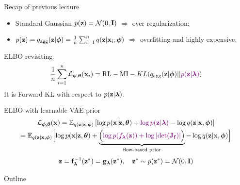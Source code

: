 \begin{frame}{Recap of previous lecture}
	\begin{itemize}
		\item Standard Gaussian $p(\mathbf{z}) = \mathcal{N}(0, \mathbf{I})$ $\Rightarrow$ over-regularization;
		\item $p(\mathbf{z}) = q_{\text{agg}}(\mathbf{z} | \boldsymbol{\phi}) = \frac{1}{n}\sum_{i=1}^n q(\mathbf{z} | \mathbf{x}_i, \boldsymbol{\phi})$ $\Rightarrow$ overfitting and highly expensive.
	\end{itemize}
	\begin{block}{ELBO revisiting}
		\vspace{-0.4cm}
		\[
		\frac{1}{n}\sum_{i=1}^n \mathcal{L}_{\boldsymbol{\phi}, \boldsymbol{\theta}}(\mathbf{x}_i) = \text{RL} - \text{MI} -  KL(q_{\text{agg}}(\mathbf{z} | \boldsymbol{\phi}) || {\color{violet}p(\mathbf{z} | \boldsymbol{\lambda})})
		\]
		It is Forward KL with respect to $p(\mathbf{z} | \boldsymbol{\lambda})$.
	\end{block}
	\begin{block}{ELBO with learnable VAE prior}
		\vspace{-0.6cm}
		{\small
			\begin{multline*}
				\mathcal{L}_{\boldsymbol{\phi}, \boldsymbol{\theta}}(\mathbf{x}) = \mathbb{E}_{q(\mathbf{z} | \mathbf{x}, \boldsymbol{\phi})} \left[ \log p(\mathbf{x} | \mathbf{z}, \boldsymbol{\theta}) + {\color{violet}\log p(\mathbf{z} | \boldsymbol{\lambda})} - \log q(\mathbf{z} | \mathbf{x}, \boldsymbol{\phi}) \right] \\
				= \mathbb{E}_{q(\mathbf{z} | \mathbf{x}, \boldsymbol{\phi})} \Bigl[ \log p(\mathbf{x} | \mathbf{z}, \boldsymbol{\theta}) + \underbrace{ \Bigl({\color{violet} \log p(f_{\boldsymbol{\lambda}}(\mathbf{z})) + \log \left| \det (\mathbf{J}_{\mathbf{f}}) \right|} \Bigr) }_{\text{flow-based prior}} - \log q(\mathbf{z} | \mathbf{x}, \boldsymbol{\phi}) \Bigr] 
			\end{multline*}
		}
		\vspace{-0.5cm}
		\[
		\mathbf{z} = \mathbf{f}^{-1}_{\boldsymbol{\lambda}}(\mathbf{z}^*) = \mathbf{g}_{\boldsymbol{\lambda}}(\mathbf{z}^*), \quad \mathbf{z}^* \sim p(\mathbf{z}^*) = \mathcal{N}(0, \mathbf{I})
		\]
	\end{block}
	\vspace{-0.5cm}
\end{frame}
\begin{frame}{Outline}
	\tableofcontents
\end{frame}
